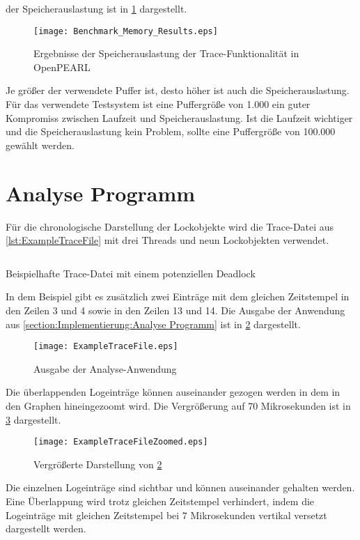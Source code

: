 der Speicherauslastung ist in \cref{fig:BenchmarkMemoryResults} dargestellt.
\begin{figure}[ht]
  \texttt{[image: Benchmark\_Memory\_Results.eps]}
  \caption{Ergebnisse der Speicherauslastung der Trace-Funktionalität in OpenPEARL}
  \label{fig:BenchmarkMemoryResults}
\end{figure}
Je größer der verwendete Puffer ist, desto höher ist auch die
Speicherauslastung. Für das verwendete Testsystem ist eine Puffergröße von 1.000
ein guter Kompromiss zwischen Laufzeit und Speicherauslastung. Ist die Laufzeit
wichtiger und die Speicherauslastung kein Problem, sollte eine Puffergröße von
100.000 gewählt werden.

\section{Analyse Programm}
\label{section:ValidierungAnalyseProgramm}
Für die chronologische Darstellung der Lockobjekte wird die Trace-Datei aus
\cref{lst:ExampleTraceFile} mit drei Threads und neun Lockobjekten verwendet.
\begin{listing}[ht]
  \begin{minipage}[ht]{\linewidth}
    \begin{multicols}{3}
      \inputminted[linenos]{text}{./Examples/ExampleTraceFile.log}
    \end{multicols}
    \caption{Beispielhafte Trace-Datei mit einem potenziellen Deadlock}
    \label{lst:ExampleTraceFile}
  \end{minipage}
\end{listing}
In dem Beispiel gibt es zusätzlich zwei Einträge mit dem gleichen Zeitstempel in
den Zeilen 3 und 4 sowie in den Zeilen 13 und 14. Die Ausgabe der Anwendung aus
\cref{section:Implementierung:Analyse Programm} ist in
\cref{fig:LockTraceVisualization} dargestellt.
\begin{figure}[ht]
  \texttt{[image: ExampleTraceFile.eps]}
  \caption{Ausgabe der Analyse-Anwendung}
  \label{fig:LockTraceVisualization}
\end{figure}
Die überlappenden Logeinträge können auseinander gezogen werden in dem in den
Graphen hineingezoomt wird. Die Vergrößerung auf 70 Mikrosekunden ist in
\cref{fig:LockTraceVisualizationZoomed} dargestellt.
\begin{figure}[ht]
  \texttt{[image: ExampleTraceFileZoomed.eps]}
  \caption{Vergrößerte Darstellung von \cref{fig:LockTraceVisualization}}
  \label{fig:LockTraceVisualizationZoomed}
\end{figure}
Die einzelnen Logeinträge sind sichtbar und können auseinander gehalten werden.
Eine Überlappung wird trotz gleichen Zeitstempel verhindert, indem die
Logeinträge mit gleichen Zeitstempel bei 7 Mikrosekunden vertikal versetzt
dargestellt werden.

